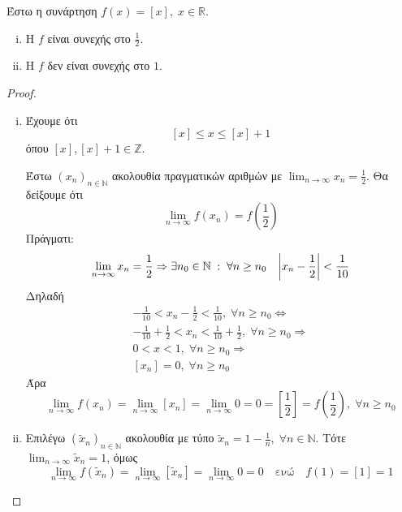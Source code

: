 \documentclass[a4paper,table]{report}
\begin{document}
\begin{example}
\item {}
  \begin{enumerate}[wide,labelindent=0pt]
    \item Έστω η συνάρτηση $ f(x) = [x], \; x \in \mathbb{R} $. 
      \begin{enumerate}[i.]
        \item Η $f$ είναι συνεχής στο $ \frac{1}{2} $.
        \item Η $f$ δεν είναι συνεχής στο $1$.
      \end{enumerate}

      \begin{proof}
      \item {}
        \begin{enumerate}[i.]
          \item Έχουμε ότι 
            \[
              [x] \leq x \leq [x]+1 
            \] 
            όπου $ [x], [x] + 1 \in \mathbb{Z} $. 

            Έστω $ {(x_{n})}_{n \in \mathbb{N}}$ ακολουθία 
            πραγματικών αριθμών με 
            $ \lim_{n \to \infty} x_{n} = \frac{1}{2} $. Θα δείξουμε ότι 
            \[ \lim_{n \to \infty} f(x_{n}) = 
            f\left(\frac{1}{2}\right) \] 
            Πράγματι:
            \[
              \lim_{n \to \infty} x_{n} = \frac{1}{2} \Rightarrow 
              \exists n_{0} \in \mathbb{N} \; : \; \forall n 
              \geq n_{0} \quad \abs{x_{n} - \frac{1}{2}} < \frac{1}{10} 
            \]
            Δηλαδή 
            \begin{gather*}
              -\frac{1}{10} < x_{n} - \frac{1}{2} < \frac{1}{10}, 
              \; \forall n \geq n_{0} \Leftrightarrow \\
              - \frac{1}{10} + \frac{1}{2} < x_{n} < 
              \frac{1}{10} + \frac{1}{2}, \; \forall n \geq n_{0} 
              \Rightarrow  \\ 0 < x <1, \; \forall n \geq n_{0} 
              \Rightarrow \\ [x_{n}] = 0, \; \forall n \geq n_{0}
            \end{gather*}
            Άρα 
            \[
              \lim_{n \to \infty} f(x_{n}) = 
              \lim_{n \to \infty} [x_{n}] = 
              \lim_{n \to \infty} 0 = 0 = \left[\frac{1}{2} \right] = 
              f\left(\frac{1}{2}\right), \; \forall n \geq n_{0} 
            \] 

          \item 
            Επιλέγω $ {(\tilde{x}_{n})}_{ n \in \mathbb{N}} $ 
            ακολουθία με τύπο 
            $ \tilde{x}_{n} = 1 - \frac{1}{n}, \; \forall n \in 
            \mathbb{N} $. Τότε
            $ \lim_{n \to \infty} \tilde{x}_{n} = 1 $, όμως 
            \[
              \lim_{n \to \infty} f(\tilde{x}_{n}) = 
              \lim_{n \to \infty} 
              [\tilde{x}_{n}] = \lim_{n \to \infty} 0 = 0 \quad 
              \text{ενώ} \quad  f(1) = [1] = 1 
            \] 
        \end{enumerate}
      \end{proof}
  \end{enumerate}
\end{example}
\end{document}
